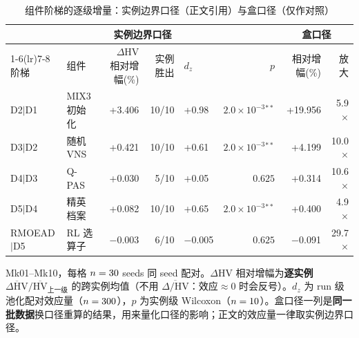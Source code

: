 \begin{table}[htbp]
  \centering
  \caption{组件阶梯的逐级增量：实例边界口径（正文引用）与盒口径（仅作对照）}
  \label{tab:ladder}
  \footnotesize
  {\setlength{\tabcolsep}{4.5pt}%
  \begin{tabular}{llrrlrrr}
    \toprule
    \multicolumn{6}{c}{\textbf{实例边界口径}} & \multicolumn{2}{c}{\textbf{盒口径}} \\
    \cmidrule(lr){1-6}\cmidrule(lr){7-8}
    阶梯 & 组件 & $\Delta$HV 相对增幅(\%) & 实例胜出 & $d_z$ & $p$ & 相对增幅(\%) & 放大 \\
    \midrule
    D2$|$D1 & MIX3 初始化 & +3.406 & 10/10 & +0.98 & $2.0\times 10^{-3}{}^{**}$ & +19.956 & 5.9$\times$ \\
    D3$|$D2 & 随机 VNS & +0.421 & 10/10 & +0.61 & $2.0\times 10^{-3}{}^{**}$ & +4.199 & 10.0$\times$ \\
    D4$|$D3 & Q-PAS & +0.030 & 5/10 & +0.05 & $0.625$ & +0.314 & 10.6$\times$ \\
    D5$|$D4 & 精英档案 & +0.082 & 10/10 & +0.65 & $2.0\times 10^{-3}{}^{**}$ & +0.400 & 4.9$\times$ \\
    RMOEAD$|$D5 & RL 选算子 & −0.003 & 6/10 & −0.005 & $0.625$ & −0.091 & 29.7$\times$ \\
    \bottomrule
  \end{tabular}
  }
  \par\vspace{3pt}\footnotesize\begin{minipage}{\linewidth}Mk01--Mk10，每格 $n=30$ seeds 同 seed 配对。$\Delta$HV 相对增幅为\textbf{逐实例} $\overline{\Delta\mathrm{HV}}/\overline{\mathrm{HV}}_{\text{上一级}}$ 的跨实例均值（不用 $\overline{\Delta/\mathrm{HV}}$：效应$\approx 0$ 时会反号）。$d_z$ 为 run 级池化配对效应量（$n=300$），$p$ 为实例级 Wilcoxon（$n=10$）。盒口径一列是\textbf{同一批数据}换口径重算的结果，用来量化口径的影响；正文的效应量一律取实例边界口径。\end{minipage}
\end{table}
